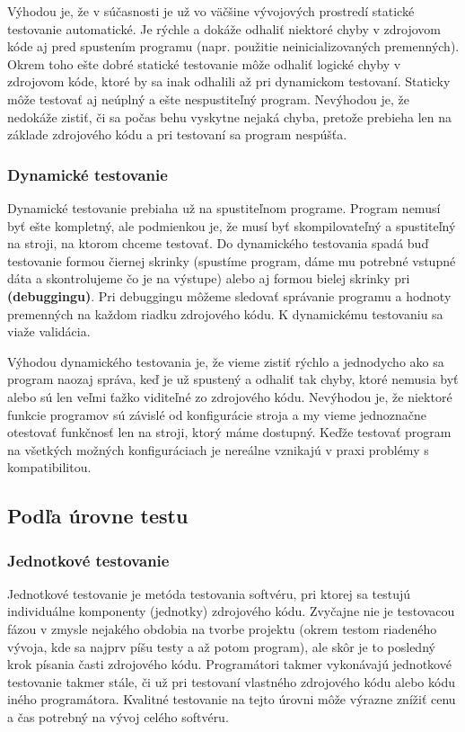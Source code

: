 \documentclass[11pt,twoside,slovak,a4paper]{article}
\begin{document}
			Výhodou je, že v súčasnosti je už vo väčšine vývojových prostredí statické testovanie automatické. Je rýchle a dokáže odhaliť niektoré chyby v zdrojovom kóde aj pred spustením programu (napr. použitie neinicializovaných premenných). Okrem toho ešte dobré statické testovanie môže odhaliť logické chyby v zdrojovom kóde, ktoré by sa inak odhalili až pri dynamickom testovaní. Staticky môže testovať aj neúplný a ešte nespustiteľný program.
			Nevýhodou je, že nedokáže zistiť, či sa počas behu vyskytne nejaká chyba, pretože prebieha len na základe zdrojového kódu a pri testovaní sa program nespúšťa.
			
		\subsubsection{Dynamické testovanie}
			Dynamické testovanie prebiaha už na spustiteľnom programe. Program nemusí byť ešte kompletný, ale podmienkou je, že musí byť skompilovateľný a spustiteľný na stroji, na ktorom chceme testovať. Do dynamického testovania spadá buď testovanie formou čiernej skrinky (spustíme program, dáme mu potrebné vstupné dáta a skontrolujeme čo je na výstupe) alebo aj formou bielej skrinky pri \textbf{(debuggingu)}. Pri debuggingu môžeme sledovať správanie programu a hodnoty premenných na každom riadku zdrojového kódu. K dynamickému testovaniu sa viaže validácia.
			
			Výhodou dynamického testovania je, že vieme zistiť rýchlo a jednodycho ako sa program naozaj správa, keď je už spustený a odhaliť tak chyby, ktoré nemusia byť alebo sú len veľmi ťažko viditeľné zo zdrojového kódu.
			Nevýhodou je, že niektoré funkcie programov sú závislé od konfigurácie stroja a my vieme jednoznačne otestovať funkčnosť len na stroji, ktorý máme dostupný. Keďže testovať program na všetkých možných konfiguráciach je nereálne vznikajú v praxi problémy s kompatibilitou.
	
	\subsection{Podľa úrovne testu}
		\subsubsection{Jednotkové testovanie} 
		
			Jednotkové testovanie je metóda testovania softvéru, pri ktorej sa testujú individuálne komponenty (jednotky) zdrojového kódu. Zvyčajne nie je testovacou fázou v zmysle nejakého obdobia na tvorbe projektu (okrem testom riadeného vývoja, kde sa najprv píšu testy a až potom program), ale skôr je to posledný krok písania časti zdrojového kódu. Programátori takmer vykonávajú jednotkové testovanie takmer stále, či už pri testovaní vlastného zdrojového kódu alebo kódu iného programátora\cite{Alba2008}. Kvalitné testovanie na tejto úrovni môže výrazne znížiť cenu a čas potrebný na vývoj celého softvéru\cite{EST2002}.
\end{document}

